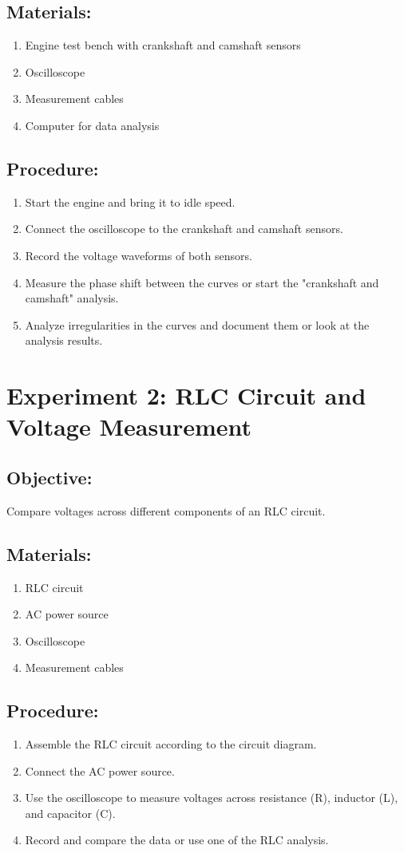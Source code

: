 \documentclass{scrreprt}
\begin{document}
\subsection*{Materials:}
\begin{enumerate}
    \item Engine test bench with crankshaft and camshaft sensors
    \item Oscilloscope
    \item Measurement cables
    \item Computer for data analysis
\end{enumerate}
\subsection*{Procedure:}
\begin{enumerate}
    \item Start the engine and bring it to idle speed.
    \item Connect the oscilloscope to the crankshaft and camshaft sensors.
    \item Record the voltage waveforms of both sensors.
    \item Measure the phase shift between the curves or start the "crankshaft and camshaft" analysis.
    \item Analyze irregularities in the curves and document them or look at the analysis results.
\end{enumerate}

\section*{Experiment 2: RLC Circuit and Voltage Measurement}
\subsection*{Objective:} Compare voltages across different components of an RLC circuit.
\subsection*{Materials:}
\begin{enumerate}
    \item RLC circuit
    \item AC power source
    \item Oscilloscope
    \item Measurement cables
\end{enumerate}
\subsection*{Procedure:}
\begin{enumerate}
    \item Assemble the RLC circuit according to the circuit diagram.
    \item Connect the AC power source.
    \item Use the oscilloscope to measure voltages across resistance (R), inductor (L), and capacitor (C).
    \item Record and compare the data or use one of the RLC analysis.
\end{enumerate}
\end{document}

